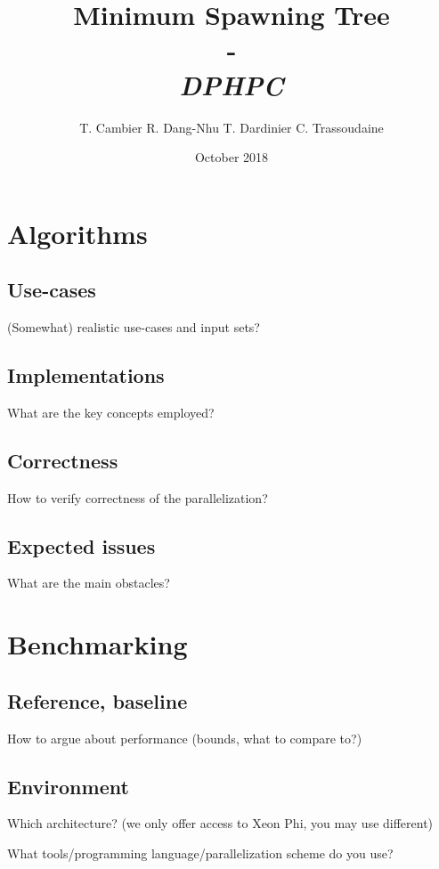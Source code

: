 \documentclass{beamer}
\institute[ETH Zürich]{\textbf{ETH Zürich}}
\date{October 2018}
\author{
    T. Cambier
    R. Dang-Nhu
    T. Dardinier
    C. Trassoudaine
}
\title{
	\textbf{Minimum Spawning Tree}\\
	-\\ 
	\textit{DPHPC}
}
\begin{document}
\frame{\titlepage}
\frame{\tableofcontents}

\section{Algorithms}
\subsection{Use-cases}
\begin{frame}
(Somewhat) realistic use-cases and input sets?
\end{frame}

\subsection{Implementations}
\begin{frame}
What are the key concepts employed?
\end{frame}

\subsection{Correctness}
\begin{frame}
How to verify correctness of the parallelization?
\end{frame}

\subsection{Expected issues}
\begin{frame}
What are the main obstacles?
\end{frame}

\section{Benchmarking}
\subsection{Reference, baseline}
\begin{frame}
How to argue about performance (bounds, what to compare to?)
\end{frame}

\subsection{Environment}
\begin{frame}
Which architecture? (we only offer access to Xeon Phi, you may use different)

What tools/programming language/parallelization scheme do you use?
\end{frame}
\end{document}
